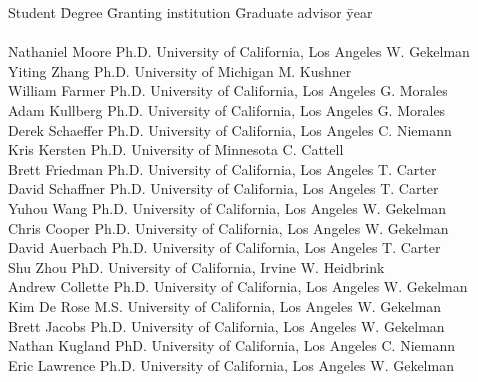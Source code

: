 \documentclass[11pt]{article}
\begin{document}
 \begin{tabbing}
Student \hspace{0.65in} \= Degree \hspace{0.1in} \= Granting institution \hspace{1.5in} \= Graduate advisor\hspace{0.3in} \= year \\
\\
Nathaniel Moore  \> Ph.D. \>  University of California, Los Angeles \> W. Gekelman \\
Yiting Zhang \> Ph.D. \> University of Michigan \> M. Kushner \\
William Farmer	 \> Ph.D. \>  University of California, Los Angeles \> G. Morales \\
Adam Kullberg	 \> Ph.D. \>  University of California, Los Angeles \> G. Morales \\
Derek Schaeffer  \> Ph.D. \>  University of California, Los Angeles \> C. Niemann \\
Kris Kersten \> Ph.D. \> University of Minnesota \> C. Cattell \\
Brett Friedman \> Ph.D. \>  University of California, Los Angeles \> T. Carter \\
David Schaffner \> Ph.D. \>  University of California, Los Angeles \> T. Carter \\
Yuhou Wang  \> Ph.D. \>  University of California, Los Angeles \> W. Gekelman \\
Chris Cooper  \> Ph.D. \>  University of California, Los Angeles \> W. Gekelman \\
David Auerbach  \> Ph.D. \>  University of California, Los Angeles \> T. Carter \\
Shu Zhou \> PhD. \> University of California, Irvine \> W. Heidbrink  \\
Andrew Collette \> Ph.D. \>  University of California, Los Angeles \> W. Gekelman \\
Kim De Rose\> M.S. \>  University of California, Los Angeles \> W. Gekelman \\
Brett Jacobs \> Ph.D. \>  University of California, Los Angeles \> W. Gekelman \\
Nathan Kugland \> PhD. \> University of California, Los Angeles \> C. Niemann \\
Eric Lawrence \> Ph.D. \>  University of California, Los Angeles \> W. Gekelman \\
 \end{tabbing}
 




%
%
%
%  
\end{document}
